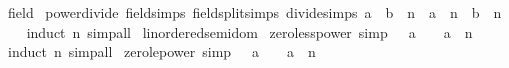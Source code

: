 \begin{isabellebody}
\isanewline
\isanewline
{}\isamarkupfalse%
\ field\isanewline
{}\isanewline
\isanewline
{}\isamarkupfalse%
\ power{\isacharunderscore}{\kern0pt}divide\ {\isacharbrackleft}{\kern0pt}field{\isacharunderscore}{\kern0pt}simps{\isacharcomma}{\kern0pt}\ field{\isacharunderscore}{\kern0pt}split{\isacharunderscore}{\kern0pt}simps{\isacharcomma}{\kern0pt}\ divide{\isacharunderscore}{\kern0pt}simps{\isacharbrackright}{\kern0pt}{\isacharcolon}{\kern0pt}\ {\isachardoublequoteopen}{\isacharparenleft}{\kern0pt}a\ {\isacharslash}{\kern0pt}\ b{\isacharparenright}{\kern0pt}\ {\isacharcircum}{\kern0pt}\ n\ {\isacharequal}{\kern0pt}\ a\ {\isacharcircum}{\kern0pt}\ n\ {\isacharslash}{\kern0pt}\ b\ {\isacharcircum}{\kern0pt}\ n{\isachardoublequoteclose}\isanewline
%
\isadelimproof
\ \ %
\endisadelimproof
%
\isatagproof
{}\isamarkupfalse%
\ {\isacharparenleft}{\kern0pt}induct\ n{\isacharparenright}{\kern0pt}\ simp{\isacharunderscore}{\kern0pt}all%
\endisatagproof
{\isafoldproof}%
%
\isadelimproof
\isanewline
%
\endisadelimproof
\isanewline
{}\isamarkupfalse%
%
\isadelimdocument
%
\endisadelimdocument
%
\isatagdocument
%
\isamarkuptrue%
%
\endisatagdocument
{\isafolddocument}%
%
\isadelimdocument
%
\endisadelimdocument
{}\isamarkupfalse%
\ linordered{\isacharunderscore}{\kern0pt}semidom\isanewline
{}\isanewline
\isanewline
{}\isamarkupfalse%
\ zero{\isacharunderscore}{\kern0pt}less{\isacharunderscore}{\kern0pt}power\ {\isacharbrackleft}{\kern0pt}simp{\isacharbrackright}{\kern0pt}{\isacharcolon}{\kern0pt}\ {\isachardoublequoteopen}{}\ {\isacharless}{\kern0pt}\ a\ {\isasymLongrightarrow}\ {}\ {\isacharless}{\kern0pt}\ a\ {\isacharcircum}{\kern0pt}\ n{\isachardoublequoteclose}\isanewline
%
\isadelimproof
\ \ %
\endisadelimproof
%
\isatagproof
{}\isamarkupfalse%
\ {\isacharparenleft}{\kern0pt}induct\ n{\isacharparenright}{\kern0pt}\ simp{\isacharunderscore}{\kern0pt}all%
\endisatagproof
{\isafoldproof}%
%
\isadelimproof
\isanewline
%
\endisadelimproof
\isanewline
{}\isamarkupfalse%
\ zero{\isacharunderscore}{\kern0pt}le{\isacharunderscore}{\kern0pt}power\ {\isacharbrackleft}{\kern0pt}simp{\isacharbrackright}{\kern0pt}{\isacharcolon}{\kern0pt}\ {\isachardoublequoteopen}{}\ {\isasymle}\ a\ {\isasymLongrightarrow}\ {}\ {\isasymle}\ a\ {\isacharcircum}{\kern0pt}\ n{\isachardoublequoteclose}\isanewline
%
\isadelimproof
\ \ %
\endisadelimproof

\end{isabellebody}
